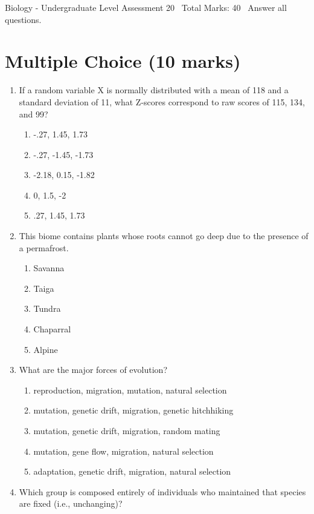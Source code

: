 \documentclass[12pt]{article}
\begin{document}
\begin{center}
Biology - Undergraduate Level Assessment 20 \
Total Marks: 40 \
Answer all questions.
\end{center}

\section*{Multiple Choice (10 marks)}
\begin{enumerate}[label=\arabic*.]
\item If a random variable X is normally distributed with a mean of 118 and a standard deviation of 11, what Z-scores correspond to raw scores of 115, 134, and 99?
\begin{enumerate}[label=(\alph*)]
    \item -.27, 1.45, 1.73
    \item -.27, -1.45, -1.73
    \item -2.18, 0.15, -1.82
    \item 0, 1.5, -2
    \item .27, 1.45, 1.73
\end{enumerate}
\item This biome contains plants whose roots cannot go deep due to the presence of a permafrost.
\begin{enumerate}[label=(\alph*)]
    \item Savanna
    \item Taiga
    \item Tundra
    \item Chaparral
    \item Alpine
\end{enumerate}
\item What are the major forces of evolution?
\begin{enumerate}[label=(\alph*)]
    \item reproduction, migration, mutation, natural selection
    \item mutation, genetic drift, migration, genetic hitchhiking
    \item mutation, genetic drift, migration, random mating
    \item mutation, gene flow, migration, natural selection
    \item adaptation, genetic drift, migration, natural selection
\end{enumerate}
\item Which group is composed entirely of individuals who maintained that species are fixed (i.e., unchanging)?

\end{enumerate}
\end{document}
